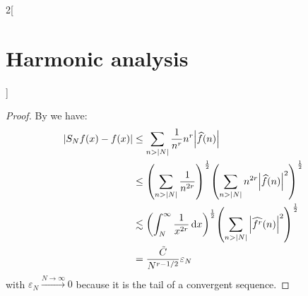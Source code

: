 \documentclass[../../../main_math.tex]{subfiles}
\begin{document}
\begin{multicols}{2}[\section{Harmonic analysis}]
\begin{corollary}
  \end{corollary}
  \begin{proof}
    By  we have:
    \begin{align*}
      \abs{S_Nf(x)-f(x)} & \leq\sum_{n>\abs{N}}\frac{1}{n^r}n^r\abs{\widehat{f}(n)}                                                                                         \\
                         & \leq{\left(\sum_{n>\abs{N}}\frac{1}{n^{2r}}\right)}^{\frac{1}{2}}{\left(\sum_{n>\abs{N}}n^{2r}\abs{\widehat{f}(n)}^2 \right)}^{\frac{1}{2}}      \\
                         & \lesssim{\left(\int_N^\infty\frac{1}{x^{2r}}\dd{x}\right)}^{\frac{1}{2}}{\left(\sum_{n>\abs{N}}\abs{\widehat{f^{r}}(n)}^2 \right)}^{\frac{1}{2}} \\
                         & =\frac{\tilde{C}}{N^{r-1/2}}\varepsilon_N
    \end{align*}
    with $\varepsilon_N\overset{N\to\infty}{\longrightarrow}0$ because it is the tail of a convergent sequence.
  \end{proof}

\end{multicols}
\end{document}
